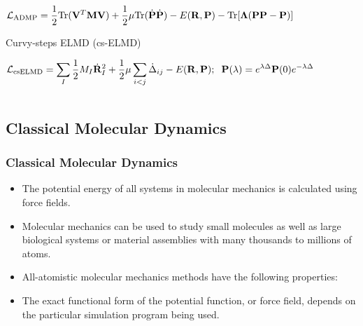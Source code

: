 \documentclass[slidestop,mathserif,compress,xcolor=svgnames]{beamer}
\begin{document}
\begin{frame}
\begin{columns}
\begin{block}{}
\begin{itemize}
\begin{enumerate}
{	  \item[] $\displaystyle{\mathcal{L}_\mathrm{ADMP} = \dfrac{1}{2}\mathrm{Tr}({\bf V}^T{\bf M}{\bf V}) + \dfrac{1}{2}\mu\mathrm{Tr}(\dot{\bf P}\dot{\bf P}) - E({\bf R},{\bf P}) - \mathrm{Tr}[{\boldsymbol\Lambda}({\bf PP}-{\bf P})]}$
	  \item {\color{tigerspurple}Curvy-steps ELMD (cs-ELMD)}
	  \item[] $\displaystyle{\mathcal{L}_\mathrm{csELMD} = \sum_I\dfrac{1}{2}M_I\dot{\bf R}^2_I + \dfrac{1}{2}\mu\sum_{i<j}\dot{\Delta}_{ij} - E({\bf R},{\bf P}) ;\hspace{0.2cm} {\bf P}(\lambda) = e^{\lambda\Delta}{\bf P}(0)e^{-\lambda\Delta}}$
	  }
	\end{enumerate}
      \end{itemize}
    \end{block}
  \end{columns}
\end{frame}

\subsection{Classical Molecular Dynamics}
\begin{frame}
  \frametitle{\small Classical Molecular Dynamics}
  \begin{block}{}
    \begin{itemize}
      \item The potential energy of all systems in molecular mechanics is calculated using force fields. 
      \item Molecular mechanics can be used to study small molecules as well as large biological systems or material assemblies with many thousands to millions of atoms.
      \item All-atomistic molecular mechanics methods have the following properties:
      \item The exact functional form of the potential function, or force field, depends on the particular simulation program being used. 
    \end{itemize}
  \end{block}
\end{frame}
\end{document}
